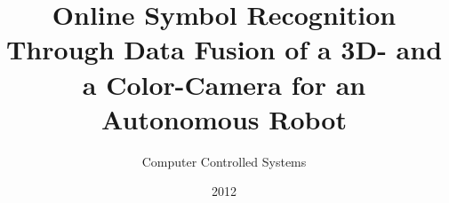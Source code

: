 \documentclass[oneside]{Ausarbeitung}
\title{Online Symbol Recognition Through Data Fusion of a 3D- and a
Color-Camera for an Autonomous Robot}
\subtitle{Computer Controlled Systems}
\date{2012}
\begin{document}
\maketitle 
 
 
 
\tableofcontents

\listoffigures

\listoftables 

\lstlistoflistings










\nocite{willowgarage:rostutorials}




\end{document}
